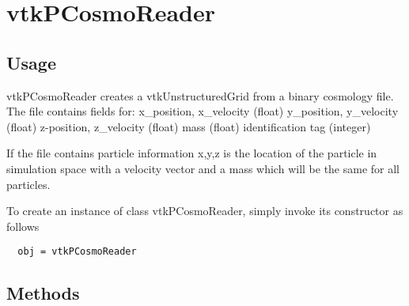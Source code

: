 \section{vtkPCosmoReader}

\subsection{Usage}

 vtkPCosmoReader creates a vtkUnstructuredGrid from a binary cosmology file.
 The file contains fields for:
     x\_position, x\_velocity (float)
     y\_position, y\_velocity (float)
     z-position, z\_velocity (float)
     mass (float)
     identification tag (integer)

 If the file contains particle information x,y,z is the location of the
 particle in simulation space with a velocity vector and a mass which
 will be the same for all particles.


To create an instance of class vtkPCosmoReader, simply
invoke its constructor as follows
\begin{verbatim}
  obj = vtkPCosmoReader
\end{verbatim}
\subsection{Methods}

